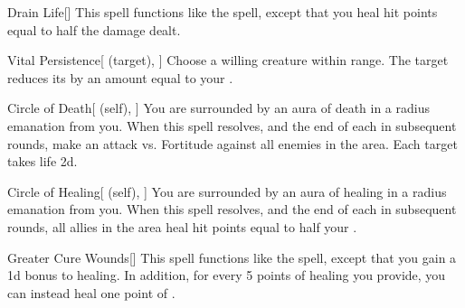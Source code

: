 \lowercase{\hypertarget{spell:Drain Life}{}}\label{spell:Drain Life}
\begin{apability}[\nth{2}]{\hypertarget{spell:Drain Life}{Drain Life}}[]
This spell functions like the  spell, except that you heal hit points equal to half the damage dealt.
\end{apability}
\vspace{0.25em}



\lowercase{\hypertarget{spell:Vital Persistence}{}}\label{spell:Vital Persistence}
\begin{attuneability}[\nth{2}]{\hypertarget{spell:Vital Persistence}{Vital Persistence}}[ (target), ]
Choose a willing creature within \rngclose range.
The target reduces its  by an amount equal to your .
\end{attuneability}
\vspace{0.25em}



\lowercase{\hypertarget{spell:Circle of Death}{}}\label{spell:Circle of Death}
\begin{attuneability}[\nth{3}]{\hypertarget{spell:Circle of Death}{Circle of Death}}[ (self), ]
You are surrounded by an aura of death in a \areamed radius emanation from you.
When this spell resolves, and the end of each  in subsequent rounds, make an attack vs. Fortitude against all enemies in the area.
\hit Each target takes life  \minus2d.
\end{attuneability}
\vspace{0.25em}



\lowercase{\hypertarget{spell:Circle of Healing}{}}\label{spell:Circle of Healing}
\begin{attuneability}[\nth{3}]{\hypertarget{spell:Circle of Healing}{Circle of Healing}}[ (self), ]
You are surrounded by an aura of healing in a \areamed radius emanation from you.
When this spell resolves, and the end of each  in subsequent rounds, all allies in the area heal hit points equal to half your .
\end{attuneability}
\vspace{0.25em}



\lowercase{\hypertarget{spell:Greater Cure Wounds}{}}\label{spell:Greater Cure Wounds}
\begin{apability}[\nth{3}]{\hypertarget{spell:Greater Cure Wounds}{Greater Cure Wounds}}[]
This spell functions like the  spell, except that you gain a \plus1d bonus to healing.
In addition, for every 5 points of healing you provide, you can instead heal one point of .
\end{apability}
\vspace{0.25em}



